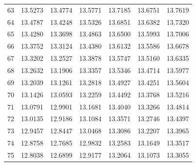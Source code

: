 \begin{longtable}{rrrrrrr}
63 & 13.5273 & 13.4774 & 13.5771 & 13.7185 & 13.6751 & 13.7619 \\
64 & 13.4787 & 13.4248 & 13.5326 & 13.6851 & 13.6382 & 13.7320 \\
65 & 13.4280 & 13.3698 & 13.4863 & 13.6500 & 13.5993 & 13.7006 \\
66 & 13.3752 & 13.3124 & 13.4380 & 13.6132 & 13.5586 & 13.6678 \\
67 & 13.3202 & 13.2527 & 13.3878 & 13.5747 & 13.5160 & 13.6335 \\
68 & 13.2632 & 13.1906 & 13.3357 & 13.5346 & 13.4714 & 13.5977 \\
69 & 13.2039 & 13.1261 & 13.2818 & 13.4927 & 13.4251 & 13.5604 \\
70 & 13.1426 & 13.0593 & 13.2259 & 13.4492 & 13.3768 & 13.5216 \\
71 & 13.0791 & 12.9901 & 13.1681 & 13.4040 & 13.3266 & 13.4814 \\
72 & 13.0135 & 12.9186 & 13.1084 & 13.3571 & 13.2746 & 13.4397 \\
73 & 12.9457 & 12.8447 & 13.0468 & 13.3086 & 13.2207 & 13.3965 \\
74 & 12.8758 & 12.7685 & 12.9832 & 13.2583 & 13.1649 & 13.3517 \\
75 & 12.8038 & 12.6899 & 12.9177 & 13.2064 & 13.1073 & 13.3055 \\
\end{longtable}
